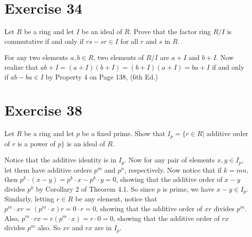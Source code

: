 \documentclass[12pt]{article}
\begin{document}
\section*{Exercise 34}

Let $R$ be a ring and let $I$ be an ideal of $R$.  Prove that the
factor ring $R/I$ is commutative if and only if $rs-sr\in I$ for all $r$ and $s$ in $R$.

For any two elements $a,b\in R$, two elements of $R/I$ are $a+I$ and $b+I$.
Now realize that $ab+I=(a+I)(b+I)=(b+I)(a+I)=ba+I$ if and only if $ab-ba\in I$
by Property 4 on Page 138, (6th Ed.)

\section*{Exercise 38}

Let $R$ be a ring and let $p$ be a fixed prime.  Show that
$I_p=\{r\in R|$ additive order of $r$ is a power of $p\}$ is an
ideal of $R$.

Notice that the additive identity is in $I_p$.  Now for any pair
of elements $x,y\in I_p$, let them have additive orders $p^m$
and $p^n$, respectively.  Now notice that if $k=mn$,
then $p^k\cdot (x-y)=p^k\cdot x-p^k\cdot y=0$, showing
that the additive order of $x-y$ divides $p^k$ by Corollary 2
of Theorem 4.1.  So since $p$ is prime, we have $x-y\in I_p$.
Similarly, letting $r\in R$ be any element,
notice that $p^m\cdot xr=(p^m\cdot x)r=0\cdot r=0$,
showing that the additive order of $xr$ divides $p^m$.
Also, $p^m\cdot rx=r(p^m\cdot x)=r\cdot 0=0$, showing
that the additive order of $rx$ divides $p^m$ also.
So $xr$ and $rx$ are in $I_p$.
\end{document}
